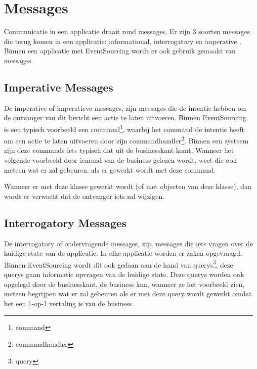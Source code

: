 
\section{Messages}
\label{sec:messages}

Communicatie in een applicatie draait rond messages. Er zijn 3 soorten messages die terug komen in een applicatie: informational, interrogatory en imperative \autocite{Verraes2015Messages}.
Binnen een applicatie met EventSourcing wordt er ook gebruik gemaakt van messages.

\subsection{Imperative Messages}
\label{subsec:imperative-messages}

De imperative of imperatieve messages, zijn messages die de intentie hebben om de ontvanger van dit bericht een actie te laten uitvoeren.
Binnen EventSourcing is een typisch voorbeeld een \Gls{command}\footnote{\glsdesc{command}}, waarbij het \Gls{command} de intentie heeft om een actie te laten uitvoeren door zijn \Gls{commandhandler}\footnote{\glsdesc{commandhandler}}. Binnen een systeem zijn deze \Glspl{command} iets typisch dat uit de businesskant komt. Wanneer het volgende voorbeeld door iemand van de business gelezen wordt, weet die ook meteen wat er zal gebeuren, als er gewerkt wordt met deze \Gls{command}.


Wanneer er met deze klasse gewerkt wordt (of met objecten van deze klasse), dan wordt er verwacht dat de ontvanger iets zal wijzigen.

\subsection{Interrogatory Messages}
\label{subsec:interrogatory-messages}

De interrogatory of ondervragende messages, zijn messages die iets vragen over de huidige state van de applicatie. In elke applicatie worden er zaken opgevraagd. Binnen EventSourcing wordt dit ook gedaan aan de hand van \Glspl{query}\footnote{\glsdesc{query}}, deze \Glspl{query} gaan informatie opvragen van de huidige state. Deze \Glspl{query} worden ook opgelegd door de businesskant, de business kan, wanneer ze het voorbeeld zien, meteen begrijpen wat er zal gebeuren als er met deze \Gls{query} wordt gewerkt omdat het een 1-op-1 vertaling is van de business.

